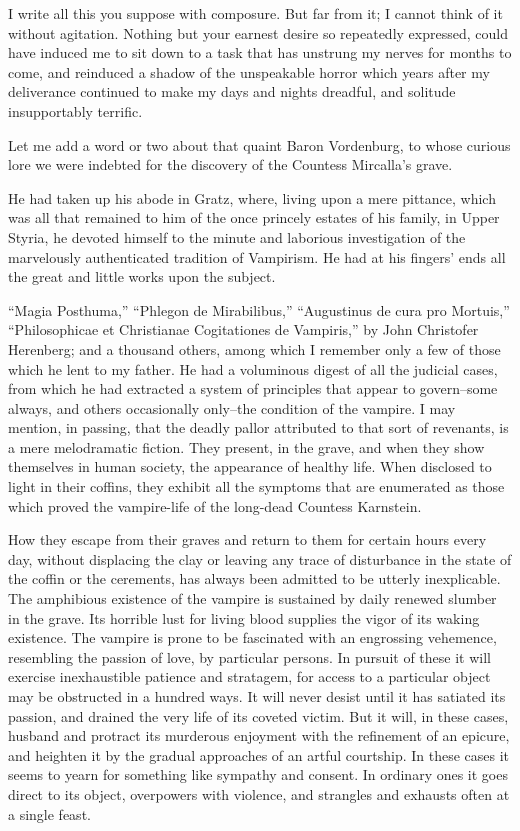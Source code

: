 \documentclass[11pt,twoside,makeidx,hidelinks,]{memoir}
\begin{document}
I write all this you suppose with composure. But far from it; I cannot
think of it without agitation. Nothing but your earnest desire so
repeatedly expressed, could have induced me to sit down to a task that
has unstrung my nerves for months to come, and reinduced a shadow of the
unspeakable horror which years after my deliverance continued to make my
days and nights dreadful, and solitude insupportably terrific.

Let me add a word or two about that quaint Baron Vordenburg, to whose
curious lore we were indebted for the discovery of the Countess
Mircalla's grave.

He had taken up his abode in Gratz, where, living upon a mere pittance,
which was all that remained to him of the once princely estates of his
family, in Upper Styria, he devoted himself to the minute and laborious
investigation of the marvelously authenticated tradition of Vampirism.
He had at his fingers' ends all the great and little works upon
the subject.

``Magia Posthuma,'' ``Phlegon de Mirabilibus,'' ``Augustinus de cura pro
Mortuis,'' ``Philosophicae et Christianae Cogitationes de Vampiris,'' by
John Christofer Herenberg; and a thousand others, among which I
remember only a few of those which he lent to my father. He had a
voluminous digest of all the judicial cases, from which he had extracted
a system of principles that appear to govern--some always, and others
occasionally only--the condition of the vampire. I may mention, in
passing, that the deadly pallor attributed to that sort of revenants, is
a mere melodramatic fiction. They present, in the grave, and when they
show themselves in human society, the appearance of healthy life. When
disclosed to light in their coffins, they exhibit all the symptoms that
are enumerated as those which proved the vampire-life of the long-dead
Countess Karnstein.

How they escape from their graves and return to them for certain hours
every day, without displacing the clay or leaving any trace of
disturbance in the state of the coffin or the cerements, has always been
admitted to be utterly inexplicable. The amphibious existence of the
vampire is sustained by daily renewed slumber in the grave. Its horrible
lust for living blood supplies the vigor of its waking existence. The
vampire is prone to be fascinated with an engrossing vehemence,
resembling the passion of love, by particular persons. In pursuit of
these it will exercise inexhaustible patience and stratagem, for access
to a particular object may be obstructed in a hundred ways. It will
never desist until it has satiated its passion, and drained the very
life of its coveted victim. But it will, in these cases, husband and
protract its murderous enjoyment with the refinement of an epicure, and
heighten it by the gradual approaches of an artful courtship. In these
cases it seems to yearn for something like sympathy and consent. In
ordinary ones it goes direct to its object, overpowers with violence,
and strangles and exhausts often at a single feast.
\end{document}

